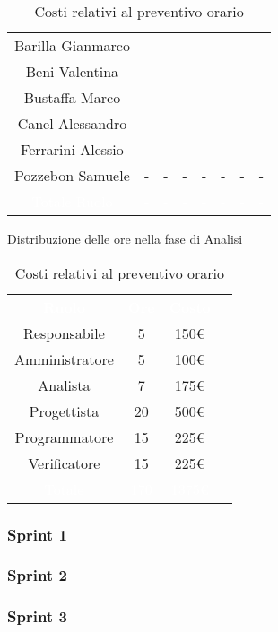 \begin{table}[h!]
\begin{minipage}[c]{0.53\textwidth}
\begin{tabular}{>{\raggedright\arraybackslash}c|cccccc|c}
		\rowcolor[RGB]{216, 235, 171}
	    	Barilla Gianmarco & - & - & - & - & - & -& -		\\[4pt]
	    \rowcolor[RGB]{233, 245, 206}
	    	Beni Valentina & - & - & - & - & - & -& -			\\[4pt]
	    \rowcolor[RGB]{216, 235, 171}
	    	Bustaffa Marco & - & - & - & - & - & -& -			\\[4pt]
        \rowcolor[RGB]{233, 245, 206}
	    	Canel Alessandro & - & - & - & - & - & -& -			\\[4pt]
        \rowcolor[RGB]{216, 235, 171}
	    	Ferrarini Alessio & - & - & - & - & - & -& -		\\[4pt]
        \rowcolor[RGB]{233, 245, 206}
	    	Pozzebon Samuele & - & - & - & - & - & -& -			\\[4pt]
		\rowcolor[RGB]{47, 106, 73}
			\textcolor{white}{Totale Ruolo} & \textcolor{white}{-} & \textcolor{white}{-} & \textcolor{white}{-} 
			& \textcolor{white}{-} & \textcolor{white}{-} & \textcolor{white}{-}
			& \textcolor{white}{-} \\[4pt]	
    \end{tabular}
    \caption{Distribuzione delle ore nella fase di Analisi}
\end{minipage}
\hfill
\begin{minipage}{0.33\textwidth}
	\centering
	\begin{tabular}{cccc}
	    \rowcolor[RGB]{33, 73, 50}
	    \textcolor{white}{\textbf{Ruolo}} & \textcolor{white}{\textbf{Ore}} & \textcolor{white}{\textbf{Costo}}\\[4pt]
	    \rowcolor[RGB]{216, 235, 171}
	    Responsabile & 5 & 150\euro\\[4pt]
	    \rowcolor[RGB]{233, 245, 206}
	    Amministratore & 5 & 100\euro\\[4pt]
        \rowcolor[RGB]{216, 235, 171}
	    Analista & 7 & 175\euro\\[4pt]
	    \rowcolor[RGB]{233, 245, 206}
	    Progettista & 20 & 500\euro\\[4pt]
        \rowcolor[RGB]{216, 235, 171}
	    Programmatore & 15 & 225\euro\\[4pt]
	    \rowcolor[RGB]{233, 245, 206}
	    Verificatore & 15 & 225\euro\\[4pt]
		\rowcolor[RGB]{47, 106, 73}
			\textcolor{white}{Totale} & \textcolor{white}{170} & \textcolor{white}{1375\euro}\\[4pt]	
    \end{tabular}	
	\caption{Costi relativi al preventivo orario}

\end{minipage}
\end{table}

\subsubsection{Sprint 1}
\subsubsection{Sprint 2}
\subsubsection{Sprint 3}

\setlength\extrarowheight{0pt}